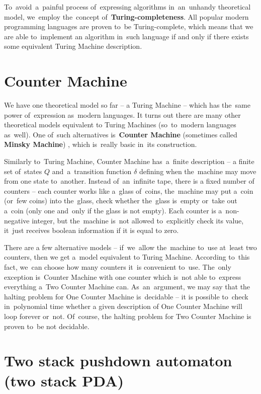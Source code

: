 \documentclass[english,shortabstract,mgr]{iithesis}
\begin{document}
To~avoid~a~painful process of~expressing algorithms in~an~unhandy theoretical model, we~employ
the~concept of~\textbf{Turing-completeness}. All popular modern programming languages are proven
to~be Turing-complete, which means that we are able to~implement an algorithm in~such
language if and only if there exists some equivalent Turing Machine description.

\section{Counter Machine}

We have one theoretical model so far -- a Turing Machine -- which has the~same power of~expression
as~modern languages. It turns out there are many other theoretical models
equivalent to Turing Machines (so~to~modern languages as~well). One of~such alternatives
is~\textbf{Counter Machine} (sometimes called \textbf{Minsky Machine}) \cite{minsky_67},
which is~really basic in~its construction.

Similarly to~Turing Machine, Counter Machine has~a~finite description -- a finite set of~states $Q$
and~a~transition function $\delta$ defining when the~machine may move from one state to~another.
Instead of~an~infinite tape, there is a fixed number of counters -- each counter works like a~glass of~coins,
the~machine may put a~coin (or~few coins) into the~glass, check whether the~glass is~empty
or~take out a~coin (only one and~only if the glass is not empty). Each counter is a~non-negative
integer, but the~machine is~not allowed to~explicitly check its value, it~just receives boolean
information if it is equal to zero.

There are a few alternative models -- if~we~allow the~machine to~use at~least two counters,
then we get a~model equivalent to Turing Machine. According to~this fact, we~can
choose how many counters it~is convenient to~use. The~only exception is~Counter Machine with
one counter which is~not able to~express everything a~Two Counter Machine can. As~an~argument,
we may say that the halting problem for One Counter Machine is~decidable -- it is possible to~check
in~polynomial time whether a given description of One Counter Machine will loop forever or~not.
Of~course, the halting problem for Two Counter Machine is proven to~be not decidable. \cite{minsky_67}

\section {Two stack pushdown automaton (two stack PDA)}
\end{document}

